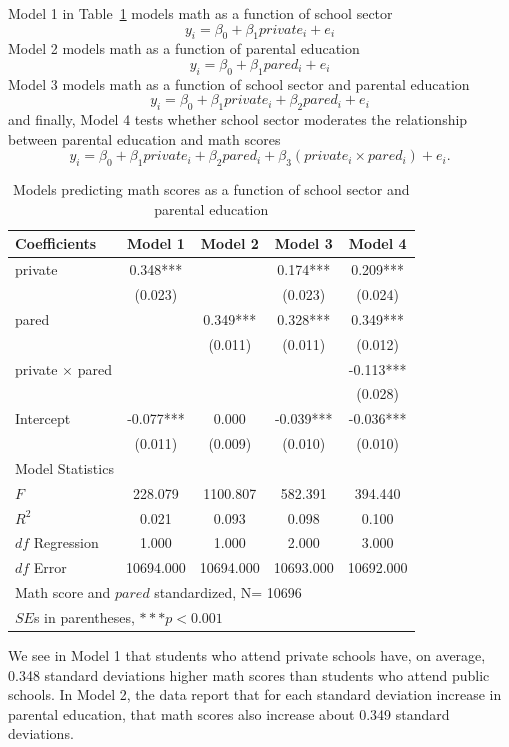 Model 1 in Table~\ref{tab:intereclscon} models math as a function of school sector
\[
y_i = \beta_0+\beta_1private_i+e_i
\]
Model 2 models math as a function of parental education
\[
y_i = \beta_0+\beta_1pared_i+e_i
\]
Model 3 models math as a function of school sector and parental education
\[
y_i = \beta_0+\beta_1private_i+\beta_2pared_i+e_i
\]
and finally, Model 4 tests whether school sector moderates the relationship between parental education and math scores
\[
y_i = \beta_0+\beta_1private_i+\beta_2pared_i+\beta_3\left(private_i \times pared_i\right)+e_i.
\]
\begin{table}[htbp]\centering
\caption{Models predicting math scores as a function of school sector and parental education
\label{tab:intereclscon}}
\begin{tabular}{lcccc}
\hline
Coefficients&Model 1&Model 2&Model 3&Model 4 \\
\hline
private   &    0.348***&        &    0.174***&    0.209***\\
      &   (0.023)  &        &   (0.023)  &   (0.024)  \\
pared    &        &    0.349***&    0.328***&    0.349***\\
      &        &   (0.011)  &   (0.011)  &   (0.012)  \\
private $\times$ pared&        &        &        &   -0.113***\\
      &        &        &        &   (0.028)  \\
Intercept    &   -0.077***&    0.000  &   -0.039***&   -0.036***\\
      &   (0.011)  &   (0.009)  &   (0.010)  &   (0.010)  \\

\hline
\multicolumn{5}{l}{Model Statistics} \\
\hline
$F$  &   228.079  &  1100.807  &   582.391  &   394.440  \\
$R^2$  &    0.021  &    0.093  &    0.098  &    0.100  \\
$df$ Regression 			 &    1.000  &    1.000  &    2.000  &    3.000  \\
$df$ Error 					 &  10694.000  &  10694.000  &  10693.000  &  10692.000  \\
\hline
\multicolumn{5}{l}{Math score and $pared$ standardized, N= 10696} \\
\multicolumn{5}{l}{$SE$s in parentheses, $***p<0.001$}
{\footnotesize{\emph{Source: ECLS-K}}} \\
\hline
\end{tabular}
\end{table}
We see in Model 1 that students who attend private schools have, on average, 0.348 standard deviations higher math scores than students who attend public schools. In Model 2, the data report that for each standard deviation increase in parental education, that math scores also increase about 0.349 standard deviations.

